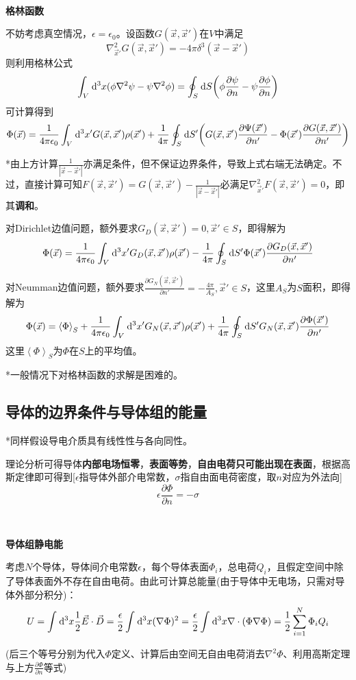 \documentclass[a4paper,UTF8,fontset=windows]{ctexart}
\newcommand*{\dr}{\hspace{0.07em}\mathrm{d}}
\newcommand*{\vd}{\vec{D}}
\newcommand*{\ve}{\vec{E}}
\newcommand*{\vx}{\vec{x}}
\newcommand*{\pt}[2][t]{\frac{\partial #2}{\partial #1}}
\begin{document}
\

\textbf{格林函数}

不妨考虑真空情况，$\epsilon=\epsilon_0$。设函数$G(\vx,\vx')$在$V$中满足
$$\nabla_{\vx'}^2G(\vx,\vx')=-4\pi\delta^3(\vx-\vx')$$
则利用格林公式
$$\int_V\dr^3x(\phi\nabla^2\psi-\psi\nabla^2\phi)=\oint_S\dr S\bigg(\phi\pt[n]{\psi}-\psi\pt[n]{\phi}\bigg)$$
可计算得到
$$\Phi(\vx)=\frac{1}{4\pi\epsilon_0}\int_V\dr^3x'G(\vx,\vx')\rho(\vx')+\frac{1}{4\pi}\oint_S\dr S'\bigg(G(\vx,\vx')\pt[n']{\Psi(\vx')}-\Phi(\vx')\pt[n']{G(\vx,\vx')}\bigg)$$

*由上方计算$\frac{1}{|\vx-\vx'|}$亦满足条件，但不保证边界条件，导致上式右端无法确定。不过，直接计算可知$F(\vx,\vx')=G(\vx,\vx')-\frac{1}{|\vx-\vx'|}$必满足$\nabla_{\vx'}^2F(\vx,\vx')=0$，即其\textbf{调和}。

对Dirichlet边值问题，额外要求$G_D(\vx,\vx')=0,\vx'\in S$，即得解为
$$\Phi(\vx)=\frac{1}{4\pi\epsilon_0}\int_V\dr^3x'G_D(\vx,\vx')\rho(\vx')-\frac{1}{4\pi}\oint_S\dr S'\Phi(\vx')\pt[n']{G_D(\vx,\vx')}$$

对Neumman边值问题，额外要求$\pt[n']{G_N(\vx,\vx')}=-\frac{4\pi}{A_S},\vx'\in S$，这里$A_S$为$S$面积，即得解为
$$\Phi(\vx)=\left<\Phi\right>_S+\frac{1}{4\pi\epsilon_0}\int_V\dr^3x'G_N(\vx,\vx')\rho(\vx')+\frac{1}{4\pi}\oint_S\dr S'G_N(\vx,\vx')\pt[n']{\Phi(\vx')}$$
这里$\left<\Phi\right>_S$为$\Phi$在$S$上的平均值。

*一般情况下对格林函数的求解是困难的。

\subsection{导体的边界条件与导体组的能量}
*同样假设导电介质具有线性性与各向同性。

理论分析可得导体\textbf{内部电场恒零}，\textbf{表面等势}，\textbf{自由电荷只可能出现在表面}，根据高斯定律即可得到[$\epsilon$指导体外部介电常数，$\sigma$指自由面电荷密度，取$n$对应为外法向]
$$\epsilon\pt[n]{\Phi}=-\sigma$$

\

\textbf{导体组静电能}

考虑$N$个导体，导体间介电常数$\epsilon$，每个导体表面$\Phi_i$，总电荷$Q_i$，且假定空间中除了导体表面外不存在自由电荷。由此可计算总能量(由于导体中无电场，只需对导体外部分积分)：
$$U=\int\dr^3x\frac{1}{2}\ve\cdot\vd=\frac{\epsilon}{2}\int\dr^3x(\nabla\Phi)^2=\frac{\epsilon}{2}\int\dr^3x\nabla\cdot(\Phi\nabla\Phi)=\frac{1}{2}\sum_{i=1}^N\Phi_iQ_i$$

(后三个等号分别为代入$\Phi$定义、计算后由空间无自由电荷消去$\nabla^2\Phi$、利用高斯定理与上方$\pt[n]{\Phi}$等式)
\end{document}
